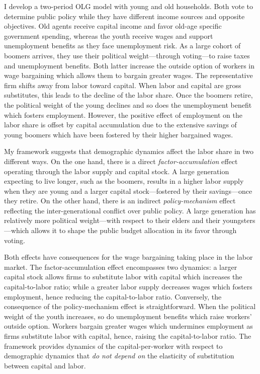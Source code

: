 I develop a two-period OLG model with young and old households. Both vote to determine public policy while they have different income sources and opposite objectives. Old agents receive capital income and favor old-age specific government spending, whereas the youth receive wages and support unemployment benefits as they face unemployment risk. As a large cohort of boomers arrives, they use their political weight---through voting---to raise taxes and unemployment benefits. Both latter increase the outside option of workers in wage bargaining which allows them to bargain greater wages. The representative firm shifts away from labor toward capital. When labor and capital are gross substitutes, this leads to the decline of the labor share. Once the boomers retire, the political weight of the young declines and so does the unemployment benefit which fosters employment. However, the positive effect of employment on the labor share is offset by capital accumulation due to the extensive savings of young boomers which have been fostered by their higher bargained wages.

My framework suggests that demographic dynamics affect the labor share in two different ways. On the one hand, there is a direct \textit{factor-accumulation} effect operating through the labor supply and capital stock. A large generation expecting to live longer, such as the boomers, results in a higher labor supply when they are young and a larger capital stock---fostered by their savings---once they retire. On the other hand, there is an indirect \textit{policy-mechanism} effect reflecting the inter-generational conflict over public policy. A large generation has relatively more political weight---with respect to their elders and their youngsters---which allows it to shape the public budget allocation in its favor through voting.

Both effects have consequences for the wage bargaining taking place in the labor market. The factor-accumulation effect encompasses two dynamics: a larger capital stock allows firms to substitute labor with capital which increases the capital-to-labor ratio; while a greater labor supply decreases wages which fosters employment, hence reducing the capital-to-labor ratio. Conversely, the consequence of the policy-mechanism effect is straightforward. When the political weight of the youth increases, so do unemployment benefits which raise workers' outside option. Workers bargain greater wages which undermines employment as firms substitute labor with capital, hence, raising the capital-to-labor ratio. The framework provides dynamics of the capital-per-worker with respect to demographic dynamics that \textit{do not depend on} the elasticity of substitution between capital and labor.

